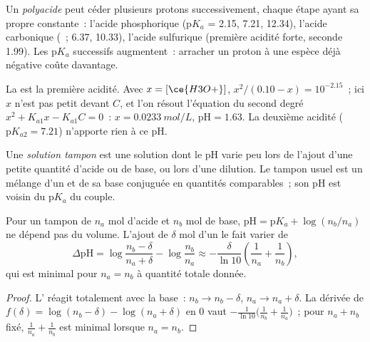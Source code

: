 \begin{definition}[Polyacide]\label{def:b1:predominant-reaction:polyprotic}
Un \emph{polyacide} peut céder plusieurs protons
successivement, chaque étape ayant sa propre constante~: l'acide
phosphorique  ($\mathrm{p}K_a$ = 2.15, 7.21, 12.34), l'acide
carbonique (~; 6.37, 10.33), l'acide sulfurique (première
acidité forte, seconde 1.99). Les $\mathrm{p}K_a$ successifs augmentent~:
arracher un proton à une espèce déjà négative coûte davantage.
\end{definition}

\begin{example}\label{ex:b1:predominant-reaction:h3po4}
La  est la première acidité. Avec
$x = [\ce{H3O+}]$,
$x^2/(0.10 - x) = 10^{-2.15}$~; ici $x$ n'est pas petit devant $C$, et
l'on résout l'équation du second degré $x^2 + K_{a1}x - K_{a1}C = 0$~:
$x =
\qty{0.0233}{mol/L}$, $\mathrm{pH} = 1.63$. La deuxième acidité
($\mathrm{p}K_{a2} = 7.21$) n'apporte rien à ce pH.
\end{example}

\begin{definition}\label{def:b1:predominant-reaction:buffer}
Une \emph{solution tampon} est une solution dont
le pH varie peu lors de l'ajout d'une petite quantité d'acide ou de base,
ou lors d'une dilution. Le tampon usuel est un mélange d'un 
et de sa base conjuguée en quantités comparables~; son pH est voisin du
$\mathrm{p}K_a$ du couple.
\end{definition}

\begin{proposition}\label{prop:b1:predominant-reaction:buffer}
Pour un tampon de $n_a$ mol d'acide et $n_b$ mol de base, $\mathrm{pH} =
\mathrm{p}K_a + \log(n_b/n_a)$ ne dépend pas du volume. L'ajout de
$\delta$ mol d'un  le fait varier de
\[
  \Delta\mathrm{pH} = \log\frac{n_b - \delta}{n_a + \delta} - \log\frac{n_b}{n_a}
  \approx -\frac{\delta}{\ln 10}\left(\frac{1}{n_a} + \frac{1}{n_b}\right),
\]
qui est minimal pour $n_a = n_b$ à quantité totale donnée.
\end{proposition}

\begin{proof}
L' réagit totalement avec la base~: $n_b \to n_b - \delta$,
$n_a \to n_a + \delta$. La dérivée de $f(\delta) = \log(n_b - \delta) -
\log(n_a + \delta)$ en 0 vaut $-\frac{1}{\ln10}\big(\frac{1}{n_b} +
\frac{1}{n_a}\big)$~; pour $n_a + n_b$ fixé, $\frac1{n_a} + \frac1{n_b}$
est minimal lorsque $n_a = n_b$.
\end{proof}

